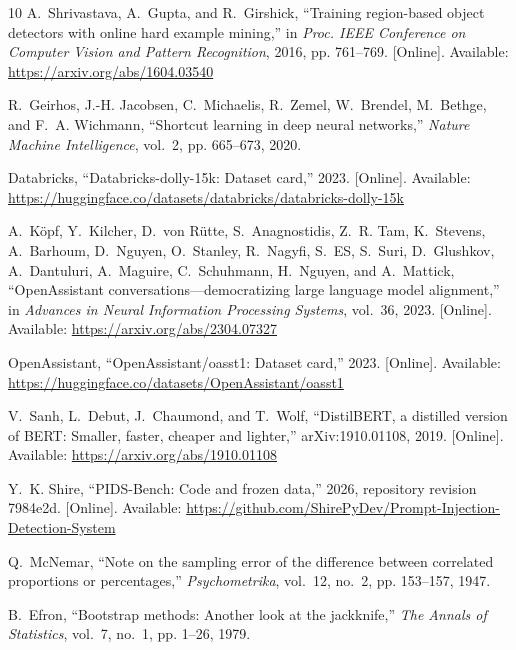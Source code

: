 \documentclass[conference]{IEEEtran}
\begin{document}
\begin{thebibliography}{10}
\BIBentryALTinterwordspacing
A.~Shrivastava, A.~Gupta, and R.~Girshick, ``Training region-based object
  detectors with online hard example mining,'' in \emph{Proc. IEEE Conference
  on Computer Vision and Pattern Recognition}, 2016, pp. 761--769. [Online].
  Available: \url{https://arxiv.org/abs/1604.03540}
\BIBentrySTDinterwordspacing

R.~Geirhos, J.-H. Jacobsen, C.~Michaelis, R.~Zemel, W.~Brendel, M.~Bethge, and
  F.~A. Wichmann, ``Shortcut learning in deep neural networks,'' \emph{Nature
  Machine Intelligence}, vol.~2, pp. 665--673, 2020.

\BIBentryALTinterwordspacing
{Databricks}, ``Databricks-dolly-15k: Dataset card,'' 2023. [Online].
  Available:
  \url{https://huggingface.co/datasets/databricks/databricks-dolly-15k}
\BIBentrySTDinterwordspacing

\BIBentryALTinterwordspacing
A.~K{\"o}pf, Y.~Kilcher, D.~von R{\"u}tte, S.~Anagnostidis, Z.~R. Tam,
  K.~Stevens, A.~Barhoum, D.~Nguyen, O.~Stanley, R.~Nagyfi, S.~ES, S.~Suri,
  D.~Glushkov, A.~Dantuluri, A.~Maguire, C.~Schuhmann, H.~Nguyen, and
  A.~Mattick, ``{OpenAssistant} conversations---democratizing large language
  model alignment,'' in \emph{Advances in Neural Information Processing
  Systems}, vol.~36, 2023. [Online]. Available:
  \url{https://arxiv.org/abs/2304.07327}
\BIBentrySTDinterwordspacing

\BIBentryALTinterwordspacing
{OpenAssistant}, ``{OpenAssistant/oasst1}: Dataset card,'' 2023. [Online].
  Available: \url{https://huggingface.co/datasets/OpenAssistant/oasst1}
\BIBentrySTDinterwordspacing

\BIBentryALTinterwordspacing
V.~Sanh, L.~Debut, J.~Chaumond, and T.~Wolf, ``{DistilBERT}, a distilled
  version of {BERT}: Smaller, faster, cheaper and lighter,'' arXiv:1910.01108,
  2019. [Online]. Available: \url{https://arxiv.org/abs/1910.01108}
\BIBentrySTDinterwordspacing

\BIBentryALTinterwordspacing
Y.~K. Shire, ``{PIDS-Bench}: Code and frozen data,'' 2026, repository revision
  7984e2d. [Online]. Available:
  \url{https://github.com/ShirePyDev/Prompt-Injection-Detection-System}
\BIBentrySTDinterwordspacing

Q.~McNemar, ``Note on the sampling error of the difference between correlated
  proportions or percentages,'' \emph{Psychometrika}, vol.~12, no.~2, pp.
  153--157, 1947.

B.~Efron, ``Bootstrap methods: Another look at the jackknife,'' \emph{The
  Annals of Statistics}, vol.~7, no.~1, pp. 1--26, 1979.

\end{thebibliography}

\end{document}
